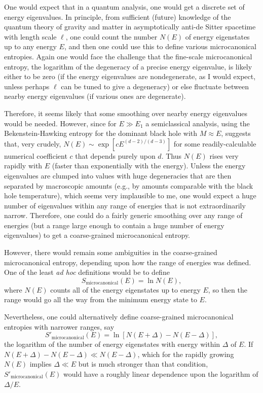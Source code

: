 \documentclass[12pt]{article} \usepackage{latexsym} \textwidth 15cm
\begin{document}
One would expect that in a quantum analysis, one would get a discrete
set of energy eigenvalues.  In principle, from sufficient (future)
knowledge of the quantum theory of gravity and matter in asymptotically
anti-de Sitter spacetime with length scale $\ell$, one could count the
number $N(E)$ of energy eigenstates up to any energy $E$, and then one
could use this to define various microcanonical entropies.  Again one
would face the challenge that the fine-scale microcanonical entropy,
the logarithm of the degeneracy of a precise energy eigenvalue, is
likely either to be zero (if the energy eigenvalues are nondegenerate,
as I would expect, unless perhaps $\ell$ can be tuned to give a
degeneracy) or else fluctuate between nearby energy eigenvalues (if
various ones are degenerate).

Therefore, it seems likely that some smoothing over nearby energy
eigenvalues would be needed.  However, since for $E \gg E_1$ a
semiclassical analysis, using the Bekenstein-Hawking entropy for the
dominant black hole with $M \approx E$, suggests that, very crudely,
$N(E) \sim \exp{[c E^{(d-2)/(d-3)}]}$ for some readily-calculable
numerical coefficient $c$ that depends purely upon $d$.  Thus $N(E)$
rises very rapidly with $E$ (faster than exponentially with the
energy).  Unless the energy eigenvalues are clumped into values with
huge degeneracies that are then separated by macroscopic amounts (e.g.,
by amounts comparable with the black hole temperature), which seems
very implausible to me, one would expect a huge number of eigenvalues
within any range of energies that is not extraordinarily narrow. 
Therefore, one could do a fairly generic smoothing over any range of
energies (but a range large enough to contain a huge number of energy
eigenvalues) to get a coarse-grained microcanonical entropy.

However, there would remain some ambiguities in the coarse-grained
microcanonical entropy, depending upon how the range of energies was
defined.  One of the least {\it ad hoc} definitions would be to define
 \begin{equation}
 S_{\mathrm{microcanonical}}(E) = \ln{N(E)},
 \label{eq:25}
 \end{equation}
where $N(E)$ counts all of the energy eigenstates up to energy $E$, so
then the range would go all the way from the minimum energy state to
$E$.

Nevertheless, one could alternatively define coarse-grained
microcanonical entropies with narrower ranges, say
 \begin{equation}
 S'_{\mathrm{microcanonical}}(E) = \ln{[N(E+\Delta)-N(E-\Delta)]},
 \label{eq:26}
 \end{equation}
the logarithm of the number of energy eigenstates with energy within
$\Delta$ of $E$.  If $N(E+\Delta)-N(E-\Delta) \ll N(E-\Delta)$, which
for the rapidly growing $N(E)$ implies $\Delta \ll E$ but is much
stronger than that condition, $S'_{\mathrm{microcanonical}}(E)$ would
have a roughly linear dependence upon the logarithm of $\Delta/E$.
\end{document}
